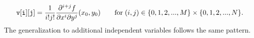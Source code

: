 \documentclass{article}
\begin{document}
\[
{\tt v[i][j]} = \frac{1}{i!j!}\frac{\partial^{i+j}f}{\partial x^i\partial y^j}(x_0,y_0)
    \qquad \text{for}\; (i,j)\in\{0,1,2,...,M\}\times\{0,1,2,...,N\}.
\]
The generalization to additional independent variables follows the same pattern.

%
%
%
%
%
%
%
\end{document}
